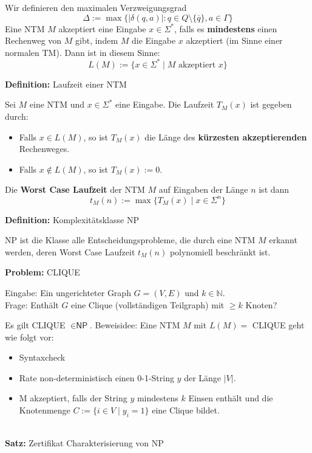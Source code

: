 \documentclass[a4paper,graphics,11pt]{article}
\begin{document}
Wir definieren den maximalen Verzweigungsgrad
$$
    \Delta := \max\{|\delta(q,a)| : q \in Q \setminus \{\overline{q}\}, a \in \Gamma\}
$$
Eine NTM $M$ akzeptiert eine Eingabe $x \in \Sigma^*$,
falls es \textbf{mindestens} einen Rechenweg von $M$ gibt,
indem $M$ die Eingabe $x$ akzeptiert (im Sinne einer normalen TM). Dann ist in diesem Sinne:
$$
    L(M) := \{x \in \Sigma^* \mid M \text{ akzeptiert } x\}
$$

\strut

\textbf{Definition:} Laufzeit einer NTM

Sei $M$ eine NTM und $x \in \Sigma^*$ eine Eingabe. Die Laufzeit $T_M(x)$ ist gegeben durch:
\begin{itemize}
    \item Falls $x \in L(M)$, so ist $T_M(x)$ die Länge des \textbf{kürzesten akzeptierenden} Rechenweges.
    \item Falls $x \notin L(M)$, so ist $T_M(x) := 0$.
\end{itemize}
Die \textbf{Worst Case Laufzeit} der NTM $M$ auf Eingaben der Länge $n$ ist dann
$$
    t_M(n) := \max\{T_M(x) \mid x \in \Sigma^n\}
$$

\strut

\textbf{Definition:} Komplexitätsklasse \textsf{NP}

\textsf{NP} ist die Klasse alle Entscheidungsprobleme,
die durch eine NTM $M$ erkannt werden,
deren Worst Case Laufzeit $t_M(n)$ polynomiell beschränkt ist.

\strut

\textbf{Problem:} CLIQUE

Eingabe: Ein ungerichteter Graph $G = (V,E)$ und $k \in \mathbb{N}$.\\
Frage: Enthält $G$ eine Clique (vollständigen Teilgraph) mit $\geq k$ Knoten?

Es gilt CLIQUE $\in \textsf{NP}$. Beweisidee: Eine NTM $M$ mit $L(M) = $ CLIQUE geht wie folgt vor:
\begin{itemize}
    \item Syntaxcheck
    \item Rate non-deterministisch einen 0-1-String $y$ der Länge $|V|$.
    \item M akzeptiert, falls der String $y$ mindestens $k$ Einsen enthält und die Knotenmenge
        $C := \{i \in V \mid y_i = 1\}$ eine Clique bildet.
\end{itemize}

\strut\\

\textbf{Satz:} Zertifikat Charakterisierung von \textsf{NP}
\end{document}
